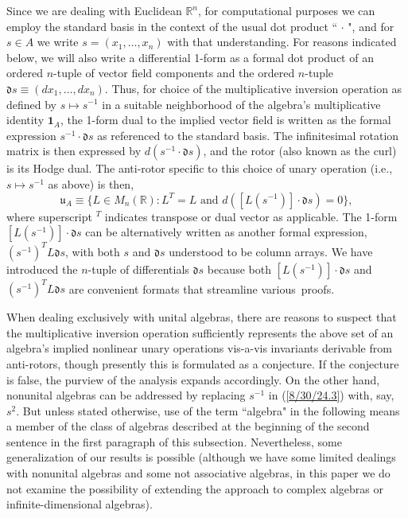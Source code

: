 \documentclass{amsart}
\numberwithin{equation}{section}
\theoremstyle{definition}
\numberwithin{theorem}{section}
\begin{document}
Since we are dealing with Euclidean $\mathbb{R}^n$, for computational purposes we can employ the standard basis in the context of the usual dot product `` $\cdot$ ", and for $s\in A$ we write $s=(x_1,\dots,x_n)$ with that understanding.  For reasons indicated below, we will also write a differential 1-form as a formal dot product of an ordered $n$-tuple of vector field components and the ordered $n$-tuple $\mathfrak{d}s \equiv (dx_1,\dots, dx_n)$. Thus, for choice of the multiplicative inversion operation as defined by $s\mapsto s^{-1}$ in a suitable neighborhood of the algebra's multiplicative identity $\mathbf{1}_A$, the 1-form dual to the implied vector field is written as the formal expression $s^{-1}\cdot \mathfrak{d}s$ as referenced to the standard basis.  The infinitesimal rotation matrix is then expressed by $d(s^{-1}\cdot \mathfrak{d}s)$, and the rotor (also known as the curl) is its Hodge dual. 
The anti-rotor specific to this choice of unary operation (i.e., $s\mapsto s^{-1}$ as above) is then,
\begin{equation}\label{8/30/24.3} \mathfrak{u}_A \equiv \{L\in M_n(\mathbb{R}): L^T=L \text{ and } d(\left[L(s^{-1})\right]\cdot \mathfrak{d}s)  = 0\},\end{equation}
where superscript $^T$ indicates transpose or dual vector as applicable.  The \mbox{1-form} $\left[L(s^{-1})\right]\cdot \mathfrak{d}s$ can be alternatively written as another formal expression, $(s^{-1})^TL\mathfrak{d}s$, with both $s$ and $\mathfrak{d}s$ understood to be column arrays. 
We have introduced the \mbox{$n$-tuple} of differentials $\mathfrak{d}s$ because both $\left[L(s^{-1})\right]\cdot \mathfrak{d}s$ and $(s^{-1})^TL\mathfrak{d}s$ are convenient formats that streamline \mbox{various proofs}.  

When dealing exclusively with unital algebras, there are reasons to suspect that the multiplicative inversion operation sufficiently represents the above set of an algebra's implied nonlinear unary operations vis-a-vis invariants derivable from anti-rotors, though presently this is formulated as a conjecture.  If the conjecture is false, the purview of the analysis expands accordingly.  On the other hand, nonunital algebras can be addressed by replacing $s^{-1}$ in (\ref{8/30/24.3}) with, say, $s^2$.  But unless stated otherwise, use of the term ``algebra" in the following means a member of the class of algebras described at the beginning of the second sentence in the first paragraph of this subsection. Nevertheless, some generalization of our results is possible (although we have some limited dealings with nonunital algebras and some not associative algebras, in this paper we do not examine the possibility of extending the approach to complex algebras or infinite-dimensional algebras). 
\end{document}
